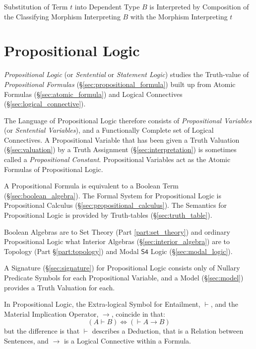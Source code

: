 Substitution of Term $t$ into Dependent Type $B$ is Interpreted by
Composition of the Classifying Morphism Interpreting $B$ with the
Morphism Interpreting $t$



\section{Propositional Logic}\label{sec:propositional_logic}

\emph{Propositional Logic} (or \emph{Sentential} or \emph{Statement Logic})
studies the Truth-value of \emph{Propositional Formulas}
(\S\ref{sec:propositional_formula}) built up from Atomic Formulas
(\S\ref{sec:atomic_formula}) and Logical Connectives
(\S\ref{sec:logical_connective}).

The Language of Propositional Logic therefore consists of \emph{Propositional
  Variables} (or \emph{Sentential Variables}), and a Functionally Complete set
of Logical Connectives. A Propositional Variable that has been given a Truth
Valuation (\S\ref{sec:valuation}) by a Truth Assignment
(\S\ref{sec:interpretation}) is sometimes called a \emph{Propositional
  Constant}. Propositional Variables act as the Atomic Formulas of Propositional
Logic.

A Propositional Formula is equivalent to a Boolean Term
(\S\ref{sec:boolean_algebra}). The Formal System for Propositional Logic is
Propositional Calculus (\S\ref{sec:propositional_calculus}). The Semantics for
Propositional Logic is provided by Truth-tables (\S\ref{sec:truth_table}).

Boolean Algebras are to Set Theory (Part \ref{part:set_theory}) and ordinary
Propositional Logic what Interior Algebras (\S\ref{sec:interior_algebra}) are to
Topology (Part \S\ref{part:topology}) and Modal $\mathsf{S4}$ Logic
(\S\ref{sec:modal_logic}).

A Signature (\S\ref{sec:signature}) for Propositional Logic consists
only of Nullary Predicate Symbols for each Propositional Variable, and
a Model (\S\ref{sec:model}) provides a Truth Valuation for each.

In Propositional Logic, the Extra-logical Symbol for Entailment, $\vdash$, and
the Material Implication Operator, $\rightarrow$, coincide in that:
\[
  (A \vdash B) \Leftrightarrow (\vdash A \rightarrow B)
\]
but the difference is that $\vdash$ describes a Deduction, that is a Relation
between Sentences, and $\rightarrow$ is a Logical Connective within a Formula.

